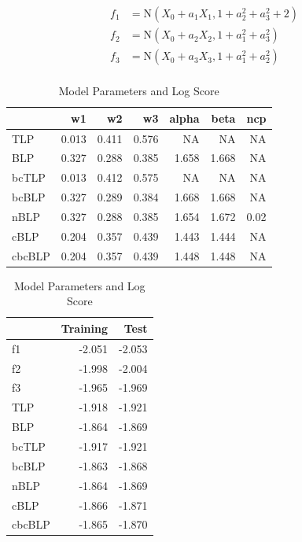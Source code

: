 \documentclass[]{article}
\begin{document}
\[
\begin{aligned}
f_1&=\text{N}(X_0+a_1X_1,1+a^2_2+a^2_3+2)\\
f_2&=\text{N}(X_0+a_2X_2,1+a^2_1+a^2_3)\\
f_3&=\text{N}(X_0+a_3X_3,1+a^2_1+a^2_2)\\
\end{aligned}
\]

\begin{table}[!h]
\caption{\label{tab:unnamed-chunk-12}Model Parameters and Log Score}

\centering
\begin{tabular}[t]{lrrrrrr}
\toprule
  & w1 & w2 & w3 & alpha & beta & ncp\\
\midrule
\rowcolor{gray!6}  TLP & 0.013 & 0.411 & 0.576 & NA & NA & NA\\
BLP & 0.327 & 0.288 & 0.385 & 1.658 & 1.668 & NA\\
\rowcolor{gray!6}  bcTLP & 0.013 & 0.412 & 0.575 & NA & NA & NA\\
bcBLP & 0.327 & 0.289 & 0.384 & 1.668 & 1.668 & NA\\
\rowcolor{gray!6}  nBLP & 0.327 & 0.288 & 0.385 & 1.654 & 1.672 & 0.02\\
\addlinespace
cBLP & 0.204 & 0.357 & 0.439 & 1.443 & 1.444 & NA\\
\rowcolor{gray!6}  cbcBLP & 0.204 & 0.357 & 0.439 & 1.448 & 1.448 & NA\\
\bottomrule
\end{tabular}
\centering
\begin{tabular}[t]{lrr}
\toprule
  & Training & Test\\
\midrule
\rowcolor{gray!6}  f1 & -2.051 & -2.053\\
f2 & -1.998 & -2.004\\
\rowcolor{gray!6}  f3 & -1.965 & -1.969\\
TLP & -1.918 & -1.921\\
\rowcolor{gray!6}  BLP & -1.864 & -1.869\\
\addlinespace
bcTLP & -1.917 & -1.921\\
\rowcolor{gray!6}  bcBLP & -1.863 & -1.868\\
nBLP & -1.864 & -1.869\\
\rowcolor{gray!6}  cBLP & -1.866 & -1.871\\
cbcBLP & -1.865 & -1.870\\
\bottomrule
\end{tabular}
\end{table}
\end{document}
